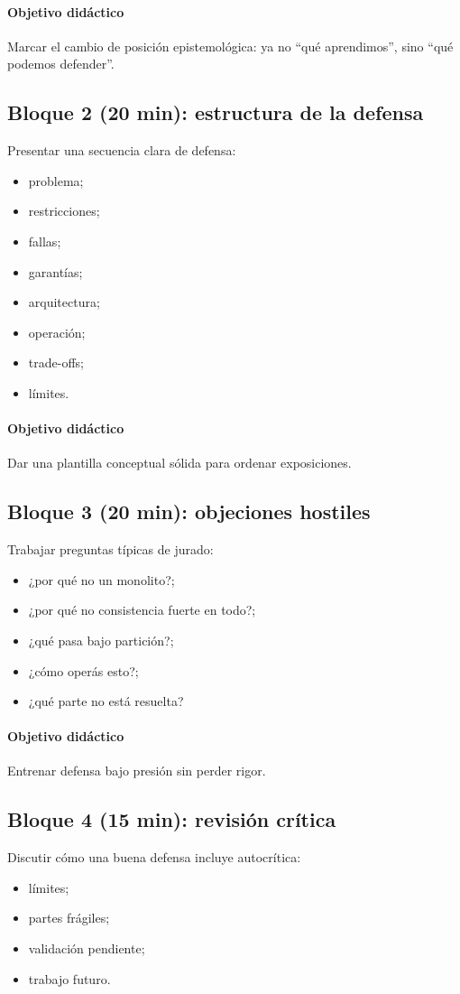\documentclass[variant=docente,cover=institutional,mode=screen]{ua-engineering-v6-article}
\begin{document}
\paragraph{Objetivo didáctico}
Marcar el cambio de posición epistemológica: ya no “qué aprendimos”, sino “qué podemos defender”.

\subsection*{Bloque 2 (20 min): estructura de la defensa}
Presentar una secuencia clara de defensa:
\begin{itemize}
\item problema;
\item restricciones;
\item fallas;
\item garantías;
\item arquitectura;
\item operación;
\item trade-offs;
\item límites.
\end{itemize}

\paragraph{Objetivo didáctico}
Dar una plantilla conceptual sólida para ordenar exposiciones.

\subsection*{Bloque 3 (20 min): objeciones hostiles}
Trabajar preguntas típicas de jurado:
\begin{itemize}
\item ¿por qué no un monolito?;
\item ¿por qué no consistencia fuerte en todo?;
\item ¿qué pasa bajo partición?;
\item ¿cómo operás esto?;
\item ¿qué parte no está resuelta?
\end{itemize}

\paragraph{Objetivo didáctico}
Entrenar defensa bajo presión sin perder rigor.

\subsection*{Bloque 4 (15 min): revisión crítica}
Discutir cómo una buena defensa incluye autocrítica:
\begin{itemize}
\item límites;
\item partes frágiles;
\item validación pendiente;
\item trabajo futuro.
\end{itemize}
\end{document}
